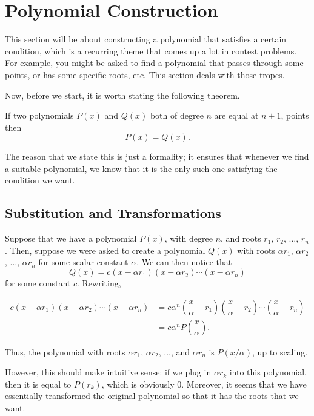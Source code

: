 \documentclass[11pt]{scrartcl}
\begin{document}
\newpage

\section{Polynomial Construction}

This section will be about constructing a polynomial that satisfies a certain condition, which is a recurring theme that comes up a lot in contest problems. For example, you might be asked to find a polynomial that passes through some points, or has some specific roots, etc. This section deals with those tropes.

Now, before we start, it is worth stating the following theorem.

\begin{theorem*}
If two polynomials $P(x)$ and $Q(x)$ both of degree $n$ are equal at $n+1$, points then \[P(x) = Q(x).\]
\end{theorem*}

The reason that we state this is just a formality; it ensures that whenever we find a suitable polynomial, we know that it is the only such one satisfying the condition we want.

\subsection{Substitution and Transformations}

Suppose that we have a polynomial $P(x)$, with degree $n$, and roots $r_1$, $r_2$, $\dots$, $r_n$. Then, suppose we were asked to create a polynomial $Q(x)$ with roots $\alpha r_1$, $\alpha r_2$, $\dots$, $\alpha r_n$ for some scalar constant $\alpha$. We can then notice that \[Q(x) = c(x-\alpha r_1)(x-\alpha r_2)\cdots(x-\alpha r_n)\] for some constant $c$. Rewriting,

\begin{align*}
c(x-\alpha r_1)(x-\alpha r_2)\cdots(x-\alpha r_n) &= c\alpha^n\left(\dfrac{x}{\alpha}-r_1\right)\left(\dfrac{x}{\alpha}-r_2\right)\cdots\left(\dfrac{x}{\alpha}-r_n\right) \\
&= c\alpha^nP\left(\dfrac{x}{\alpha}\right).
\end{align*}

Thus, the polynomial with roots $\alpha r_1$, $\alpha r_2$, $\dots$, and $\alpha r_n$ is $P(x/\alpha)$, up to scaling.

However, this should make intuitive sense: if we plug in $\alpha r_k$ into this polynomial, then it is equal to $P(r_k)$, which is obviously $0$. Moreover, it seems that we have essentially transformed the original polynomial so that it has the roots that we want.
\end{document}
